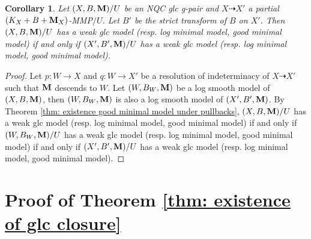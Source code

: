 \documentclass[11pt]{amsart}
\numberwithin{equation}{section}
\newcommand{\Mm}{{\bf{M}}}
\newtheorem{cor}[thm]{Corollary}
\theoremstyle{definition}
\theoremstyle{definition}
\theoremstyle{definition}
\begin{document}
\begin{cor}\label{cor: keep model under mmp}
Let $(X,B,\Mm)/U$ be an NQC glc g-pair and $X\dashrightarrow X'$ a partial $(K_X+B+\Mm_X)$-MMP$/U$. Let $B'$ be the strict transform of $B$ on $X'$. Then $(X,B,\Mm)/U$ has a weak glc model (resp. log minimal model, good minimal model) if and only if $(X',B',\Mm)/U$ has a weak glc model (resp. log minimal model, good minimal model).
\end{cor}
\begin{proof}
Let $p: W\rightarrow X$ and $q: W\rightarrow X'$ be a resolution of indeterminacy of $X\dashrightarrow X'$ such that $\Mm$ descends to $W$. Let $(W,B_W,\Mm)$ be a log smooth model of $(X,B,\Mm)$, then $(W,B_W,\Mm)$ is also a log smooth model of $(X',B',\Mm)$. By Theorem \ref{thm: existence good minimal model under pullbacks}, $(X,B,\Mm)/U$ has a weak glc model (resp. log minimal model, good minimal model) if and only if $(W,B_W,\Mm)/U$ has a weak glc model (resp. log minimal model, good minimal model) if and only if $(X',B',\Mm)/U$ has a weak glc model (resp. log minimal model, good minimal model).
\end{proof}










\section{Proof of Theorem \ref{thm: existence of glc closure} }
\end{document}
